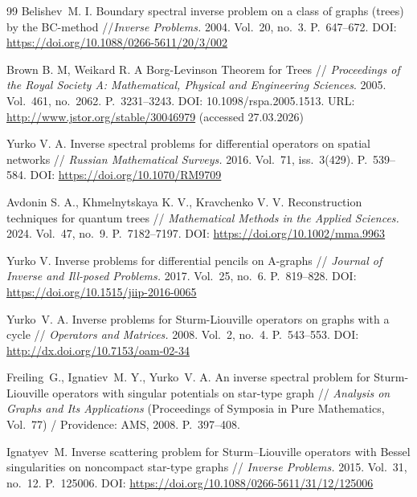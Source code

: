 \documentclass[a4paper, 12pt] {article}
\theoremstyle{plain}
\theoremstyle{remark}
\theoremstyle{plain}
\theoremstyle{definition}
\numberwithin{equation}{section}
\begin{document}
\begin{thebibliography}{99}
 Belishev~M. I. Boundary spectral inverse problem on a class of graphs (trees) by the BC-method //{\it  Inverse Problems.} 2004. Vol.~20, no.~3. P.~647--672. DOI: \url{https://doi.org/10.1088/0266-5611/20/3/002}

 Brown B. M, Weikard R. A Borg-Levinson Theorem for Trees // {\it Proceedings of the Royal Society A: Mathematical, Physical and Engineering Sciences}. 2005. Vol.~461, no.~2062. P.~3231--3243. DOI: 10.1098/rspa.2005.1513.
URL: \url{http://www.jstor.org/stable/30046979} (accessed 27.03.2026)


Yurko  V. A. Inverse spectral problems for differential operators on spatial networks // {\it Russian Mathematical Surveys.} 2016. 
Vol.~71, iss.~3(429). P.~539--584. DOI: \url{ https://doi.org/10.1070/RM9709}

  Avdonin S. A., Khmelnytskaya K. V., Kravchenko V. V. Reconstruction techniques for quantum trees // {\it Mathematical Methods in the Applied Sciences.} 2024. Vol.~47, no.~9. P.~7182--7197. DOI: \url{https://doi.org/10.1002/mma.9963}



 Yurko V. Inverse problems for differential pencils on A-graphs // {\it Journal of Inverse and Ill-posed Problems.} 2017. Vol.~25, no.~6. P.~819--828. DOI: \url{https://doi.org/10.1515/jiip-2016-0065}

  Yurko~V. A. Inverse problems for Sturm-Liouville operators on graphs with a cycle // {\it Operators
and Matrices.} 2008. Vol.~2, no.~4. P.~543--553. DOI: \url{http://dx.doi.org/10.7153/oam-02-34}

 Freiling~G., Ignatiev~M. Y., Yurko~V. A.  An inverse spectral problem for Sturm-Liouville operators with singular potentials on star-type graph  // {\it Analysis on Graphs and Its Applications} (Proceedings of Symposia in Pure Mathematics, Vol.~77) / Providence: AMS, 2008. P.~397--408.

 Ignatyev~M. Inverse scattering problem for Sturm--Liouville operators with Bessel singularities on noncompact star-type graphs // {\it Inverse Problems.} 2015. Vol.~31, no.~12. P.~125006.
DOI: \url{https://doi.org/10.1088/0266-5611/31/12/125006}



\end{thebibliography}
\end{document}
